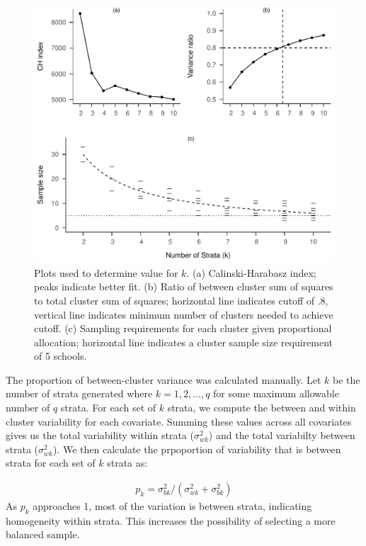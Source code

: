 \documentclass[man,floatsintext]{apa6}
\begin{document}
\begin{figure}[tbp]
\includegraphics[width=1\linewidth]{GenSamp-Paper_files/figure-latex/fig-k-plots-1} \caption{Plots used to determine value for $k$. (a) Calinski-Harabasz index; peaks indicate better fit. (b) Ratio of between cluster sum of squares to total cluster sum of squares; horizontal line indicates cutoff of .8, vertical line indicates minimum number of clusters needed to achieve cutoff. (c) Sampling requirements for each cluster given proportional allocation; horizontal line indicates a cluster sample size requirement of 5 schools.}\label{fig:fig-k-plots}
\end{figure}

The proportion of between-cluster variance was calculated manually. Let \(k\) be the number of strata generated where \(k = 1, 2, ..., q\) for some maximum allowable number of \(q\) strata. For each set of \(k\) strata, we compute the between and within cluster variability for each covariate. Summing these values across all covariates gives us the total variability within strata (\(\sigma_{wk}^2\)) and the total variabilty between strata (\(\sigma_{wk}^2\)). We then calculate the prpoportion of variability that is between strata for each set of \(k\) strata as:

\begin{align} \label{eq:pk}
p_k = \sigma_{bk}^2/(\sigma_{wk}^2 + \sigma_{bk}^2)
\end{align}
As \(p_k\) approaches 1, most of the variation is between strata, indicating homogeneity within strata. This increases the possibility of selecting a more balanced sample.
\end{document}
